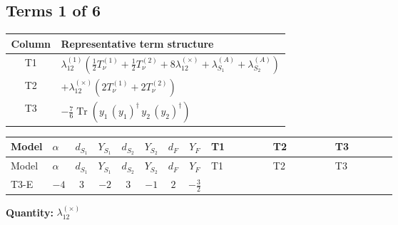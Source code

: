 \documentclass[8pt]{article}
\begin{document}
\begin{landscape}
\subsection*{Terms 1 of 6}
\begin{center}
\begin{tabular}{@{}c >{\raggedright\arraybackslash}p{0.82\linewidth}@{}}
\toprule
Column & Representative term structure \\
\midrule
T1 & \(\displaystyle {\lambda_{12}^{(1)}} \left(\frac{1}{2} T_{\nu}^{(1)}+\frac{1}{2} T_{\nu}^{(2)}+8 {\lambda_{12}^{(\times)}}+{\lambda_{S_1}^{(A)}}+{\lambda_{S_2}^{(A)}}\right)\) \\
\midrule
T2 & \(\displaystyle +{\lambda_{12}^{(\times)}} (2 T_{\nu}^{(1)}+2 T_{\nu}^{(2)})\) \\
\midrule
T3 & \(\displaystyle -\frac{7}{6} \operatorname{Tr}\!\left({y_1}\,\left({y_1}\right)^{\dagger}\,{y_2}\,\left({y_2}\right)^{\dagger}\right)\) \\
\midrule
\bottomrule
\end{tabular}
\end{center}
\smallskip
\tiny
\begin{longtable}{@{}llcccccc >{\raggedright\arraybackslash}p{0.21\linewidth} >{\raggedright\arraybackslash}p{0.21\linewidth} >{\raggedright\arraybackslash}p{0.21\linewidth}@{}}
\toprule
Model & $\alpha$ & $d_{S_1}$ & $Y_{S_1}$ & $d_{S_2}$ & $Y_{S_2}$ & $d_F$ & $Y_F$ & T1 & T2 & T3 \\
\midrule
\endfirsthead
\toprule
Model & $\alpha$ & $d_{S_1}$ & $Y_{S_1}$ & $d_{S_2}$ & $Y_{S_2}$ & $d_F$ & $Y_F$ & T1 & T2 & T3 \\
\midrule
\endhead
T3-E & $-4$ & $3$ & $-2$ & $3$ & $-1$ & $2$ & $-\frac{3}{2}$ & \scriptsize\adjustbox{max width=\linewidth}{$\begin{gathered} {\lambda_{12}^{(1)}} \left(\frac{1}{2} T_{\nu}^{(1)}+\frac{1}{2} T_{\nu}^{(2)}+8 {\lambda_{12}^{(\times)}}+{\lambda_{S_1}^{(A)}}+{\lambda_{S_2}^{(A)}}\right)\end{gathered}$} & \scriptsize\adjustbox{max width=\linewidth}{$\begin{gathered} +{\lambda_{12}^{(\times)}} (2 T_{\nu}^{(1)}+2 T_{\nu}^{(2)})\end{gathered}$} & \scriptsize\adjustbox{max width=\linewidth}{$\begin{gathered} -\frac{7}{6} \operatorname{Tr}\!\left({y_1}\,\left({y_1}\right)^{\dagger}\,{y_2}\,\left({y_2}\right)^{\dagger}\right)\end{gathered}$} \\
\midrule
\bottomrule
\end{longtable}
\clearpage
\noindent\textbf{Quantity: }$\lambda_{12}^{(\times)}$\par\smallskip

\end{landscape}
\end{document}
